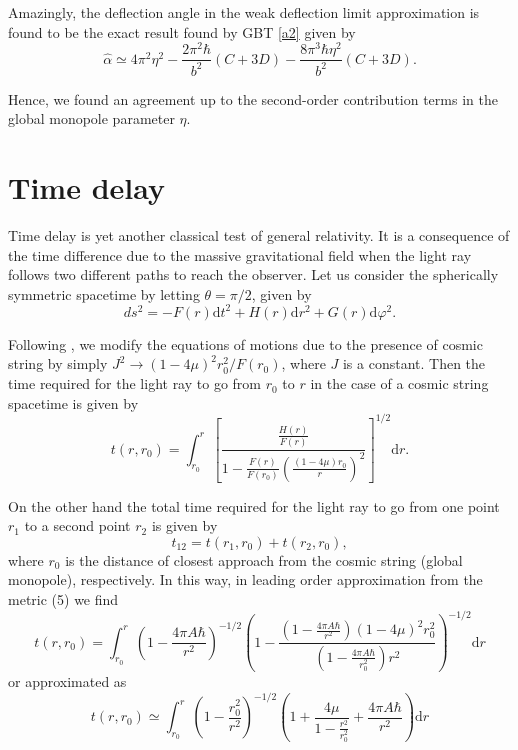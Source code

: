 \documentclass[preprint,superscriptaddress,amsfonts,amssymb,amsmath,showpacs]{revtex4}
\begin{document}
Amazingly, the deflection angle in the weak deflection limit approximation is found to be the exact result found by GBT \eqref{a2} given by
\begin{equation}
\hat{\alpha}\simeq 4 \pi^2 \eta^2-\frac{2 \pi^2 \hbar }{b^2}\left( C+3D \right)-\frac{8 \pi^3 \hbar \eta^2 }{b^2}\left(C+3D\right).
\end{equation}

Hence, we found an agreement up to the second-order contribution terms in the global monopole parameter $\eta$. 

\section{Time delay}

Time delay is yet another classical test of general relativity. It is a consequence of the time difference due to the massive gravitational field when the light ray follows two different paths to reach the observer. Let us consider the spherically symmetric spacetime by letting $\theta=\pi/2$, given by
\begin{equation}
ds^2 = -F(r) \mathrm{d}t^2 + H(r) \mathrm{d}r^2 + G(r)\mathrm{d}\varphi^2.
\end{equation}

Following \cite{weinberg}, we modify the equations of motions due to the presence of cosmic string by simply $J^2\to (1-4\mu)^2 r_0^2/F(r_0)$, where $J$ is a constant. Then the time required for the light ray to go from $r_0$ to $r$ in the case of a cosmic string spacetime is given by
\begin{equation}
t(r,r_0)=\int_{r_0}^{r} \left[\frac{\frac{H(r)}{F(r)}}{1-\frac{F(r)}{F(r_0)}\left(\frac{(1-4\mu) r_0}{r} \right)^2}  \right]^{1/2} \mathrm{d}r.
\end{equation}

On the other hand the total time required for the light ray to go from one point $r_1$ to a second point $r_2$ is given by
\begin{equation}
t_{12}=t(r_1,r_0)+t(r_2,r_0),
\end{equation}
where $r_0$ is the distance of closest approach from the cosmic string (global monopole), respectively. In this way, in leading order approximation from the metric (5) we find
\begin{equation}
t(r,r_0)=\int_{r_0}^{r} \left(1-\frac{4 \pi A \hbar}{r^2}   \right)^{-1/2} \left(1-   \frac{\left(1-\frac{4 \pi A \hbar}{r^2}   \right)(1-4\mu)^2 r_0^2}{\left(1-\frac{4 \pi A \hbar}{r_0^2}   \right)r^2}\right)^{-1/2} \mathrm{d}r
\end{equation}
or approximated as
\begin{equation}
t(r,r_0)\simeq \int_{r_0}^{r}\left( 1-\frac{r_0^2}{r^2} \right)^{-1/2}\left(1+\frac{4 \mu}{1-\frac{r^2}{r_0^2}}+\frac{4 \pi A \hbar}{r^2} \right) \mathrm{d}r
\end{equation}
\end{document}
